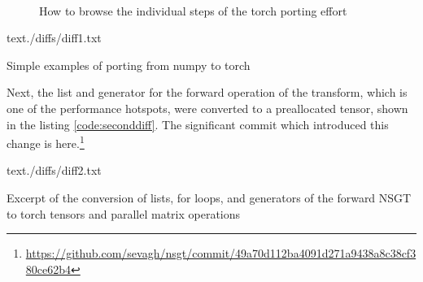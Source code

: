\documentclass[report.tex]{subfiles}
\begin{document}
\begin{figure}[!ht]
	\centering
	\\
	\caption{How to browse the individual steps of the torch porting effort}
	\label{fig:ghcommitbrowser}
\end{figure}

\begin{listing}[ht]
  \centering
\begin{inputminted}[linenos,breaklines,frame=single,fontsize=\scriptsize]{text}{./diffs/diff1.txt}
\end{inputminted}
  \caption{Simple examples of porting from numpy to torch}
  \label{code:firstdiff}
\end{listing}

Next, the list and generator for the forward operation of the transform, which is one of the performance hotspots, were converted to a preallocated tensor, shown in the listing \ref{code:seconddiff}. The significant commit which introduced this change is here.\footnote{\url{https://github.com/sevagh/nsgt/commit/49a70d112ba4091d271a9438a8c38cf380ce62b4}}

\begin{listing}[ht]
  \centering
\begin{inputminted}[linenos,breaklines,frame=single,fontsize=\scriptsize]{text}{./diffs/diff2.txt}
\end{inputminted}
  \caption{Excerpt of the conversion of lists, for loops, and generators of the forward NSGT to torch tensors and parallel matrix operations}
  \label{code:seconddiff}
\end{listing}
\end{document}
